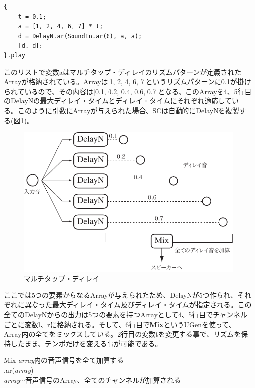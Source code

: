 \documentclass{jsarticle}
\begin{document}
\begin{lstlisting}[caption=マルチタップ・ディレイ, label=code:multitap]
{
	t = 0.1;
	a = [1, 2, 4, 6, 7] * t;
	d = DelayN.ar(SoundIn.ar(0), a, a);
	[d, d];
}.play
\end{lstlisting}

このリストで変数aはマルチタップ・ディレイのリズムパターンが定義されたArrayが格納されている。Arrayは[1, 2, 4, 6, 7]というリズムパターンに0.1が掛けられているので、その内容は[0.1, 0.2, 0.4, 0.6, 0.7]となる、このArrayを4、5行目のDelayNの最大ディレイ・タイムとディレイ・タイムにそれぞれ適応している。このように引数にArrayが与えられた場合、SCは自動的にDelayNを複製する(図\ref{fig:multitap})。

\begin{figure}[htbp]
	\begin{center}
		\includegraphics[scale=0.7]{multitap.pdf}
	\end{center}
	\caption{マルチタップ・ディレイ}
	\label{fig:multitap}
\end{figure}

ここでは5つの要素からなるArrayが与えられたため、DelayNが5つ作られ、それぞれに異なった最大ディレイ・タイム及びディレイ・タイムが指定される。この全てのDelayNからの出力は5つの要素を持つArrayとして4、5行目でチャンネルごとに変数l、rに格納される。そして、6行目で{\bf Mix}というUGenを使って、Array内の全てをミックスしている。2行目の変数tを変更する事で、リズムを保持したまま、テンポだけを変える事が可能である。

\begin{itembox}[l]{Mix}
{\footnotesize 
{\it array}内の音声信号を全て加算する\\
.ar({\it array})\\
{\it array}$\cdots$音声信号のArray、全てのチャンネルが加算される\\
}
\end{itembox}
\end{document}
